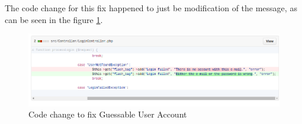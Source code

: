 The code change for this fix happened to just be modification of the message, as can be seen in the figure \ref{fig:fix_guessable_account}.

\begin{figure}[ht]
	\centering
	\includegraphics[width=.8\linewidth]{figures/fix_guessable_account.png}
	\caption{Code change to fix Guessable User Account}
	\label{fig:fix_guessable_account}
\end{figure}

\clearpage